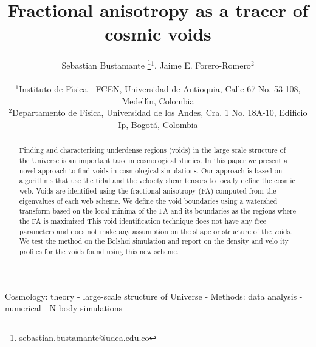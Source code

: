 \documentclass[a4,useAMS,usenatbib,usegraphicx]{latex/mn2e}
\begin{document}
\title{Fractional anisotropy as a tracer of cosmic voids}
\author[S. Bustamante and J.E. Forero-Romero]{
\parbox[t]{\textwidth}{\raggedright 
  Sebastian Bustamante \thanks{sebastian.bustamante@udea.edu.co}$^{1}$,
  Jaime E. Forero-Romero$^{2}$ 
}
\vspace*{6pt}\\
$^1$Instituto de F\'{\i}sica - FCEN, Universidad de Antioquia, Calle
67 No. 53-108, Medell\'{\i}n, Colombia\\ 
$^2$Departamento de F\'{i}sica, Universidad de los Andes, Cra. 1
No. 18A-10, Edificio Ip, Bogot\'a, Colombia
}

\maketitle

\begin{abstract}
Finding and characterizing underdense regions (voids) in the large
scale structure of the Universe is an important task in cosmological
studies.  
In this paper we present a novel approach to find voids in
cosmological simulations.  
Our approach is based on algorithms that use the tidal and the
velocity shear tensors to locally define the cosmic web.
Voids are identified using the fractional anisotropy (FA) computed
from the eigenvalues of each web scheme. 
We define the void boundaries using a watershed transform based on the
local minima of the FA and its boundaries as the regions where the FA
is maximized
This void identification technique does not have any free parameters
and does not make any assumption on the shape or structure of the
voids.  
We test the method on the Bolshoi simulation and report on the density
and velo ity profiles for the voids found using this new scheme. 
\end{abstract}

\begin{keywords}
Cosmology: theory - large-scale structure of Universe -
Methods: data analysis - numerical - N-body simulations
\end{keywords}



\end{document}
